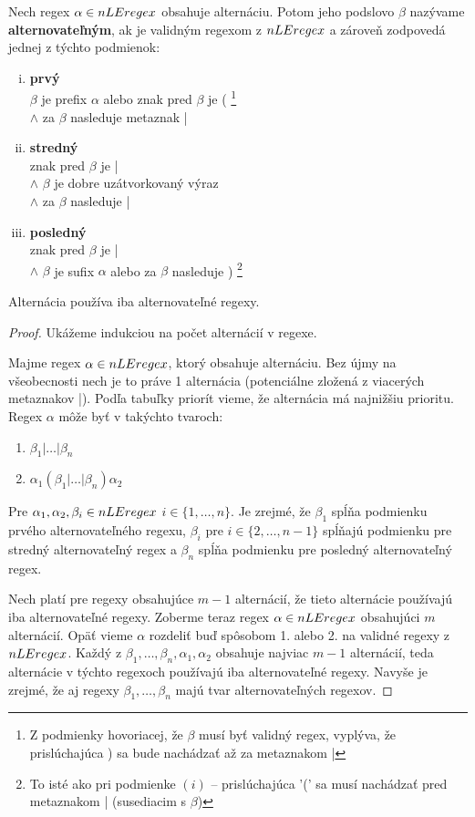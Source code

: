 \begin{df}
Nech regex $\alpha \in nLEregex$ obsahuje alternáciu. Potom jeho podslovo $\beta$ nazývame \textbf{alternovateľným}, ak je validným regexom z $nLEregex$ a zároveň zodpovedá jednej z týchto podmienok:
\begin{enumerate}[(i)]
\item \textbf{prvý} \\ $\beta$ je prefix $\alpha$ alebo znak pred $\beta$ je ( \footnote{Z podmienky hovoriacej, že $\beta$ musí byť validný regex, vyplýva, že prislúchajúca ) sa bude nachádzať až za metaznakom |} 
\\ $\wedge$ za $\beta$ nasleduje metaznak |
\item \textbf{stredný} \\ znak pred $\beta$ je | \\ $\wedge$ $\beta$ je dobre uzátvorkovaný výraz \\ $\wedge$ za $\beta$ nasleduje |
\item \textbf{posledný} \\ znak pred $\beta$ je | \\
$\wedge$ $\beta$ je sufix $\alpha$ alebo za $\beta$ nasleduje ) \footnote{To isté ako pri podmienke $(i)$ -- prislúchajúca '(' sa musí nachádzať pred metaznakom | (susediacim s $\beta$)}
\end{enumerate}
\end{df}

\begin{lema}
Alternácia používa iba alternovateľné regexy.
\end{lema}
\begin{proof}
Ukážeme indukciou na počet alternácií v regexe.

Majme regex $\alpha \in nLEregex$, ktorý obsahuje alternáciu. Bez újmy na všeobecnosti nech je to práve 1 alternácia (potenciálne zložená z viacerých metaznakov |). Podľa tabuľky priorít vieme, že alternácia má najnižšiu prioritu. Regex $\alpha$ môže byť v takýchto tvaroch:
\begin{enumerate}
\item $\beta_1|\dots|\beta_n$
\item $\alpha_1(\beta_1|\dots|\beta_n)\alpha_2$
\end{enumerate}
Pre $\alpha_1,\alpha_2,\beta_i\in nLEregex$ $i\in\lbrace 1,\dots,n\rbrace$. Je zrejmé, že $\beta_1$ spĺňa podmienku prvého alternovateľného regexu, $\beta_i$ pre $i\in\lbrace 2,\dots,n-1\rbrace$ spĺňajú podmienku pre stredný alternovateľný regex a $\beta_n$ spĺňa podmienku pre posledný alternovateľný regex.

Nech platí pre regexy obsahujúce $m-1$ alternácií, že tieto alternácie používajú iba alternovateľné regexy. Zoberme teraz regex $\alpha \in nLEregex$ obsahujúci $m$ alternácií. Opäť vieme $\alpha$ rozdeliť buď spôsobom 1. alebo 2. na validné regexy z $nLEregex$. Každý z $\beta_1,\dots,\beta_n,\alpha_1,\alpha_2$ obsahuje najviac $m-1$ alternácií, teda alternácie v týchto regexoch používajú iba alternovateľné regexy. Navyše je zrejmé, že aj regexy $\beta_1,\dots,\beta_n$ majú tvar alternovateľných regexov.
\end{proof}

